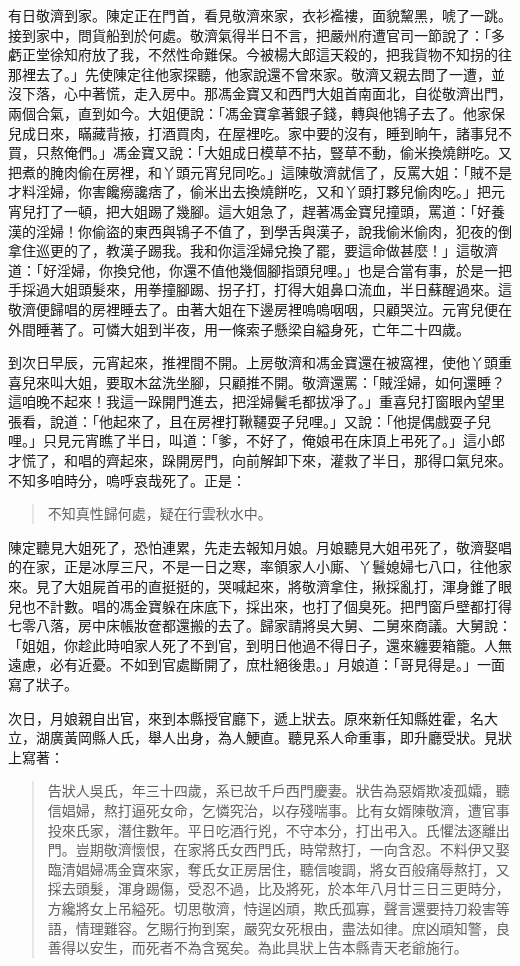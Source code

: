有日敬濟到家。陳定正在門首，看見敬濟來家，衣衫襤褸，面貌黧黑，唬了一跳。接到家中，問貨船到於何處。敬濟氣得半日不言，把嚴州府遭官司一節說了：「多虧正堂徐知府放了我，不然性命難保。今被楊大郎這天殺的，把我貨物不知拐的往那裡去了。」先使陳定往他家探聽，他家說還不曾來家。敬濟又親去問了一遭，並沒下落，心中著慌，走入房中。那馮金寶又和西門大姐首南面北，自從敬濟出門，兩個合氣，直到如今。大姐便說：「馮金寶拿著銀子錢，轉與他鴇子去了。他家保兒成日來，瞞藏背掖，打酒買肉，在屋裡吃。家中要的沒有，睡到晌午，諸事兒不買，只熬俺們。」馮金寶又說：「大姐成日模草不拈，豎草不動，偷米換燒餅吃。又把煮的腌肉偷在房裡，和丫頭元宵兒同吃。」這陳敬濟就信了，反罵大姐：「賊不是才料淫婦，你害饞癆讒痞了，偷米出去換燒餅吃，又和丫頭打夥兒偷肉吃。」把元宵兒打了一頓，把大姐踢了幾腳。這大姐急了，趕著馮金寶兒撞頭，罵道：「好養漢的淫婦！你偷盜的東西與鴇子不值了，到學舌與漢子，說我偷米偷肉，犯夜的倒拿住巡更的了，教漢子踢我。我和你這淫婦兌換了罷，要這命做甚麼！」這敬濟道：「好淫婦，你換兌他，你還不值他幾個腳指頭兒哩。」也是合當有事，於是一把手採過大姐頭髮來，用拳撞腳踢、拐子打，打得大姐鼻口流血，半日蘇醒過來。這敬濟便歸唱的房裡睡去了。由著大姐在下邊房裡嗚嗚咽咽，只顧哭泣。元宵兒便在外間睡著了。可憐大姐到半夜，用一條索子懸梁自縊身死，亡年二十四歲。

到次日早辰，元宵起來，推裡間不開。上房敬濟和馮金寶還在被窩裡，使他丫頭重喜兒來叫大姐，要取木盆洗坐腳，只顧推不開。敬濟還罵：「賊淫婦，如何還睡？這咱晚不起來！我這一跺開門進去，把淫婦鬢毛都拔凈了。」重喜兒打窗眼內望里張看，說道：「他起來了，且在房裡打鞦韆耍子兒哩。」又說：「他提偶戲耍子兒哩。」只見元宵瞧了半日，叫道：「爹，不好了，俺娘弔在床頂上弔死了。」這小郎才慌了，和唱的齊起來，跺開房門，向前解卸下來，灌救了半日，那得口氣兒來。不知多咱時分，嗚呼哀哉死了。正是：
\begin{quote}
不知真性歸何處，疑在行雲秋水中。
\end{quote}

陳定聽見大姐死了，恐怕連累，先走去報知月娘。月娘聽見大姐弔死了，敬濟娶唱的在家，正是冰厚三尺，不是一日之寒，率領家人小廝、丫鬟媳婦七八口，往他家來。見了大姐屍首弔的直挺挺的，哭喊起來，將敬濟拿住，揪採亂打，渾身錐了眼兒也不計數。唱的馮金寶躲在床底下，採出來，也打了個臭死。把門窗戶壁都打得七零八落，房中床帳妝奩都還搬的去了。歸家請將吳大舅、二舅來商議。大舅說：「姐姐，你趁此時咱家人死了不到官，到明日他過不得日子，還來纏要箱籠。人無遠慮，必有近憂。不如到官處斷開了，庶杜絕後患。」月娘道：「哥見得是。」一面寫了狀子。

次日，月娘親自出官，來到本縣授官廳下，遞上狀去。原來新任知縣姓霍，名大立，湖廣黃岡縣人氏，舉人出身，為人鯁直。聽見系人命重事，即升廳受狀。見狀上寫著：
\begin{quote}
告狀人吳氏，年三十四歲，系已故千戶西門慶妻。狀告為惡婿欺凌孤孀，聽信娼婦，熬打逼死女命，乞憐究治，以存殘喘事。比有女婿陳敬濟，遭官事投來氏家，潛住數年。平日吃酒行兇，不守本分，打出弔入。氏懼法逐離出門。豈期敬濟懷恨，在家將氏女西門氏，時常熬打，一向含忍。不料伊又娶臨清娼婦馮金寶來家，奪氏女正房居住，聽信唆調，將女百般痛辱熬打，又採去頭髮，渾身踢傷，受忍不過，比及將死，於本年八月廿三日三更時分，方纔將女上吊縊死。切思敬濟，恃逞凶頑，欺氏孤寡，聲言還要持刀殺害等語，情理難容。乞賜行拘到案，嚴究女死根由，盡法如律。庶凶頑知警，良善得以安生，而死者不為含冤矣。為此具狀上告本縣青天老爺施行。
\end{quote}

